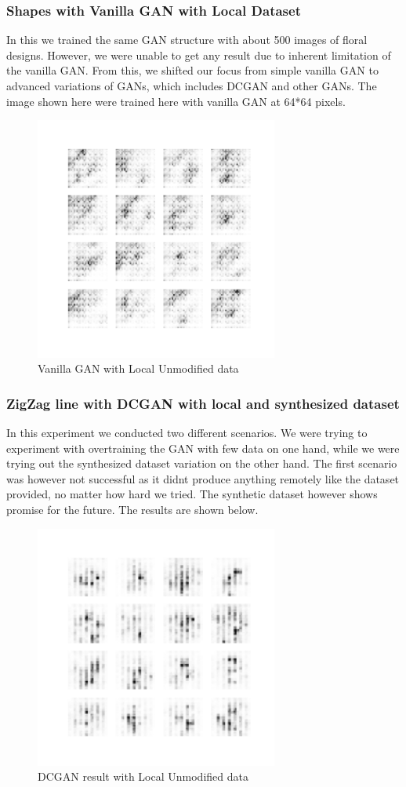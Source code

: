 \documentclass{article}
\begin{document}
\subsubsection{Shapes with Vanilla GAN with Local Dataset}
In this we trained the same GAN structure with about 500 images of floral designs. However, we were unable to get any result due to inherent limitation of the vanilla GAN. From this, we shifted our focus from simple vanilla GAN to advanced variations of GANs, which includes DCGAN and other GANs. The image shown here were trained here with vanilla GAN at 64*64 pixels.
\begin{figure}[H]
    \centering
    \includegraphics[width=8cm]{images/GANunmodified.png}
    \caption{Vanilla GAN with Local Unmodified data}
\end{figure}


\subsubsection{ZigZag line with DCGAN with local and synthesized dataset}
In this experiment we conducted two different scenarios. We were trying to experiment with overtraining the GAN with few data on one hand, while we were trying out the synthesized dataset variation on the other hand. The first scenario was however not successful as it didnt produce anything remotely like the dataset provided, no matter how hard we tried. The synthetic dataset however shows promise for the future. The results are shown below.
\begin{figure}[H]
    \centering
    \includegraphics[width=8cm]{images/DCGANunmodified.png}
    \caption{DCGAN result with Local Unmodified data}
\end{figure}
\end{document}
